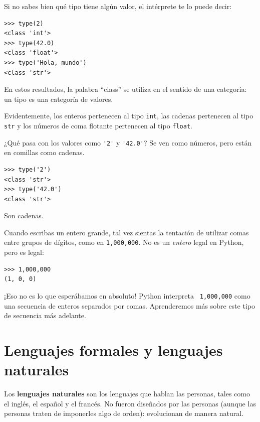 \documentclass[10pt]{book}
\begin{document}
Si no sabes bien qué tipo tiene algún valor, el intérprete te lo
puede decir:

\begin{verbatim}
>>> type(2)
<class 'int'>
>>> type(42.0)
<class 'float'>
>>> type('Hola, mundo')
<class 'str'>
\end{verbatim}
%
En estos resultados, la palabra ``class'' se utiliza en el sentido de
una categoría: un tipo es una categoría de valores.

Evidentemente, los enteros pertenecen al tipo {\tt int},
las cadenas pertenecen al tipo {\tt str} y los números de
coma flotante pertenecen al tipo {\tt float}.

¿Qué pasa con los valores como \verb"'2'" y \verb"'42.0'"?
Se ven como números, pero están en comillas como
cadenas.

\begin{verbatim}
>>> type('2')
<class 'str'>
>>> type('42.0')
<class 'str'>
\end{verbatim}
%
Son cadenas.

Cuando escribas un entero grande, tal vez sientas la tentación de utilizar comas
entre grupos de dígitos, como en {\tt 1,000,000}.  No es un
{\em entero} legal en Python, pero es legal:

\begin{verbatim}
>>> 1,000,000
(1, 0, 0)
\end{verbatim}
%
¡Eso no es lo que esperábamos en absoluto!  Python interpreta {\tt
  1,000,000} como una secuencia de enteros separados por comas.  Aprenderemos
más sobre este tipo de secuencia más adelante.




\section{Lenguajes formales y lenguajes naturales}

Los {\bf lenguajes naturales} son los lenguajes que hablan las personas,
tales como el inglés, el español y el francés.  No fueron diseñados
por las personas (aunque las personas traten de imponerles algo de orden):
evolucionan de manera natural.
\end{document}
